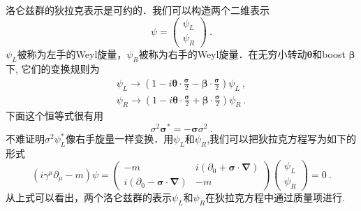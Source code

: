 
洛仑兹群的狄拉克表示是可约的．我们可以构造两个二维表示
\begin{equation}
\psi = \begin{pmatrix}
\psi_L \\
\psi_R
\end{pmatrix}~.
\end{equation}
$\psi_L$被称为左手的Weyl旋量，$\psi_R$被称为右手的Weyl旋量．在无穷小转动$\mathbf \theta$和boost $\mathbf \beta$下, 它们的变换规则为
\begin{align}
\psi_L \rightarrow (1-i \boldsymbol \theta \cdot \frac{\boldsymbol \sigma}{2} - \boldsymbol \beta \cdot \frac{\boldsymbol \sigma}{2})\psi_L ~, \\
\psi_R \rightarrow (1-i\boldsymbol \theta \cdot \frac{\boldsymbol \sigma}{2}+ \boldsymbol \beta \cdot \frac{\boldsymbol \sigma}{2})\psi_R ~.
\end{align}
下面这个恒等式很有用
\begin{equation}
\sigma^2\boldsymbol \sigma^* = - \boldsymbol \sigma \sigma^2~.
\end{equation}
不难证明$\sigma^2\psi^*_L$像右手旋量一样变换．用$\psi_L$和$\psi_R$,我们可以把狄拉克方程写为如下的形式
\begin{equation}
(i\gamma^\mu\partial_\mu - m)\psi = \begin{pmatrix}
- m & i (\partial_0+\boldsymbol \sigma \cdot \boldsymbol \nabla) \\
i(\partial_0-\boldsymbol\sigma\cdot \boldsymbol\nabla) & -m 
\end{pmatrix} \begin{pmatrix}
\psi_L \\ \psi_R 
\end{pmatrix}=0~.
\end{equation}
从上式可以看出，两个洛仑兹群的表示$\psi_L$和$\psi_R$在狄拉克方程中通过质量项进行.

